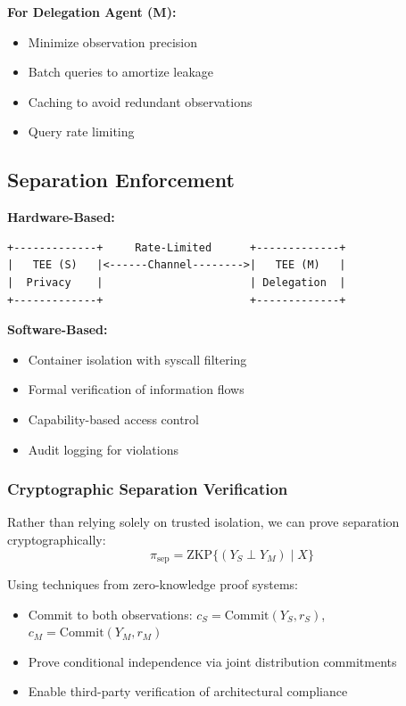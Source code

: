 \documentclass[11pt,a4paper]{article}
\theoremstyle{definition}
\newcommand{\given}{\mid}
\newcommand{\indep}{\perp}
\begin{document}
\textbf{For Delegation Agent (M):}

\begin{itemize}
    \item Minimize observation precision
    \item Batch queries to amortize leakage
    \item Caching to avoid redundant observations
    \item Query rate limiting
\end{itemize}

\subsection{Separation Enforcement}

\textbf{Hardware-Based:}
\begin{verbatim}
+-------------+     Rate-Limited      +-------------+
|   TEE (S)   |<------Channel-------->|   TEE (M)   |
|  Privacy    |                       | Delegation  |
+-------------+                       +-------------+
\end{verbatim}

\textbf{Software-Based:}

\begin{itemize}
    \item Container isolation with syscall filtering
    \item Formal verification of information flows
    \item Capability-based access control
    \item Audit logging for violations
\end{itemize}

\subsubsection{Cryptographic Separation Verification}

Rather than relying solely on trusted isolation, we can prove separation cryptographically:
\[
\pi_{\text{sep}} = \text{ZKP}\{(Y_S \indep Y_M) \given X\}
\]

Using techniques from zero-knowledge proof systems:

\begin{itemize}
    \item Commit to both observations: $c_S = \text{Commit}(Y_S, r_S)$, $c_M = \text{Commit}(Y_M, r_M)$
    \item Prove conditional independence via joint distribution commitments
    \item Enable third-party verification of architectural compliance
\end{itemize}
\end{document}
